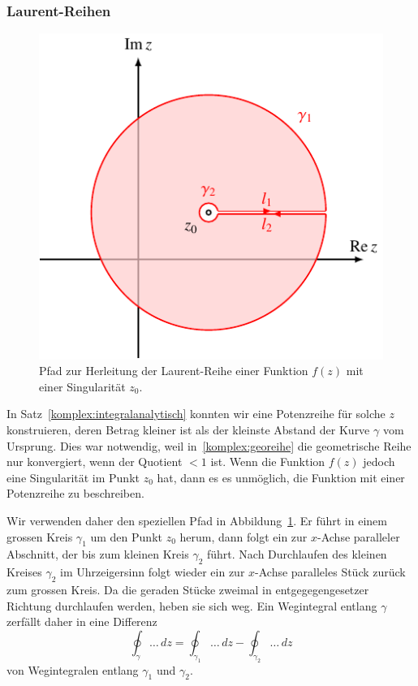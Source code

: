 \subsubsection{Laurent-Reihen}
\label{sssec:LaurentReihen}
\begin{figure}
\centering
\includegraphics{chapters/080-funktionentheorie/images/laurent.pdf}
\caption{Pfad zur Herleitung der Laurent-Reihe einer Funktion $f(z)$
mit einer Singularität $z_0$.
\label{komplex:laurentpfad}}
\end{figure}%
%
In Satz~\ref{komplex:integralanalytisch} konnten wir eine Potenzreihe für
solche $z$ konstruieren, deren Betrag kleiner ist als der kleinste Abstand
der Kurve $\gamma$ vom Ursprung.
Dies war notwendig, weil in~\eqref{komplex:georeihe} die geometrische Reihe
nur konvergiert, wenn der Quotient $<1$ ist.
Wenn die Funktion $f(z)$ jedoch eine Singularität im Punkt $z_0$ hat, dann
es es unmöglich, die Funktion mit einer Potenzreihe zu beschreiben.

Wir verwenden daher den speziellen Pfad in Abbildung~\ref{komplex:laurentpfad}.
Er führt in einem grossen Kreis $\gamma_1$ um den Punkt $z_0$ herum,
dann folgt ein zur $x$-Achse paralleler Abschnitt, der bis zum kleinen
Kreis $\gamma_2$ führt.
Nach Durchlaufen des kleinen Kreises $\gamma_2$ im Uhrzeigersinn folgt wieder
ein zur $x$-Achse paralleles Stück zurück zum grossen Kreis.
Da die geraden Stücke zweimal in entgegegengesetzer Richtung durchlaufen
werden, heben sie sich weg.
Ein Wegintegral entlang $\gamma$ zerfällt daher in eine Differenz
\[
\oint_\gamma\dots\,dz
=
\oint_{\gamma_1}\dots\,dz
-
\oint_{\gamma_2}\dots\,dz
\]
von Wegintegralen entlang $\gamma_1$ und $\gamma_2$.

